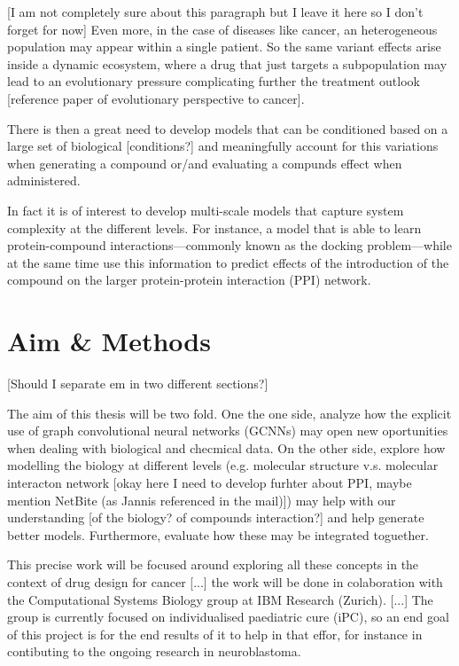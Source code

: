 \documentclass{article}
\begin{document}
[I am not completely sure about this paragraph but I leave it here so I don't forget for
now] Even more, in the case of diseases like cancer, an heterogeneous population may
appear within a single patient. So the same variant effects arise inside a dynamic
ecosystem, where a drug that just targets a subpopulation may lead to an evolutionary
pressure complicating further the treatment outlook [reference paper of evolutionary
perspective to cancer].

There is then a great need to develop models that can be conditioned based on a large
set of biological [conditions?] and meaningfully account for this variations when
generating a compound or/and evaluating a compunds effect when administered.

In fact it is of interest to develop multi-scale models that capture system complexity
at the different levels. For instance, a model that is able to learn protein-compound
interactions---commonly known as the docking problem---while at the same time use this
information to predict effects of the introduction of the compound on the larger
protein-protein interaction (PPI) network.

    \section*{Aim \& Methods}
[Should I separate em in two different sections?]

The aim of this thesis will be two fold. One the one side, analyze how the explicit use
of graph convolutional neural networks (GCNNs) may open new oportunities when dealing
with biological and checmical data. On the other side, explore how modelling the biology
at different levels (e.g. molecular structure v.s. molecular interacton network [okay
here I need to develop furhter about PPI, maybe mention NetBite (as Jannis referenced in
the mail)]) may help with our understanding [of the biology? of compounds interaction?]
and help generate better models. Furthermore, evaluate how these may be integrated
toguether.

This precise work will be focused around exploring all these concepts in the context of
drug design for cancer [...] the work will be done in colaboration with the
Computational Systems Biology group at IBM Research (Zurich). [...] The group is
currently focused on individualised paediatric cure (iPC), so an end goal of this
project is for the end results of it to help in that effor, for instance in contibuting
to the ongoing research in neuroblastoma.
\end{document}
